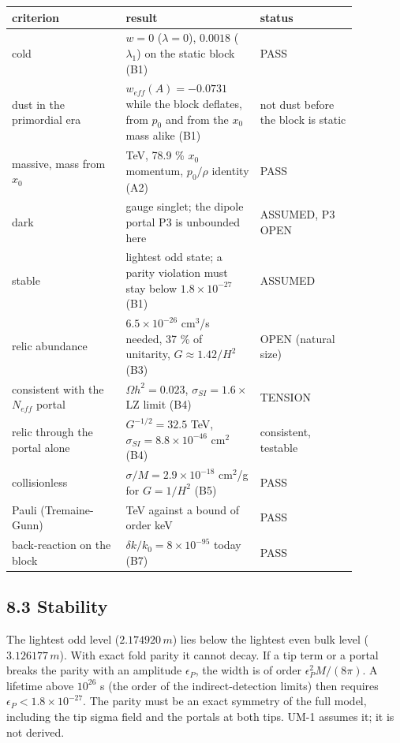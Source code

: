 \documentclass[11pt]{article}
\begin{document}
\begin{longtable}{>{\raggedright\arraybackslash}p{0.285\linewidth}>{\raggedright\arraybackslash}p{0.336\linewidth}>{\raggedright\arraybackslash}p{0.248\linewidth}}
\toprule
\textbf{criterion} & \textbf{result} & \textbf{status} \\
\midrule
cold & $w = 0$ ($\lambda = 0$), $0.0018$ ($\lambda_1$) on the static block (B1) & PASS \\
dust in the primordial era & $w_{eff}(A) = -0.0731$ while the block deflates, from $p_0$ and from the $x_0$ mass alike (B1) & not dust before the block is static \\
massive, mass from $x_0$ & 50.9 TeV, 78.9 \% $x_0$ momentum, $p_0/\rho$ identity (A2) & PASS \\
dark & gauge singlet; the dipole portal P3 is unbounded here & ASSUMED, P3 OPEN \\
stable & lightest odd state; a parity violation must stay below $1.8\times10^{-27}$ (B1) & ASSUMED \\
relic abundance & $6.5\times10^{-26}$ cm$^3$/s needed, 37 \% of unitarity, $G \approx 1.42/H^2$ (B3) & OPEN (natural size) \\
consistent with the $N_{eff}$ portal & $\Omega h^2 = 0.023$, $\sigma_{SI} = 1.6\times$ LZ limit (B4) & TENSION \\
relic through the portal alone & $G^{-1/2} = 32.5$ TeV, $\sigma_{SI} = 8.8\times10^{-46}$ cm$^2$ (B4) & consistent, testable \\
collisionless & $\sigma/M = 2.9\times10^{-18}$ cm$^2$/g for $G = 1/H^2$ (B5) & PASS \\
Pauli (Tremaine-Gunn) & 50.9 TeV against a bound of order keV & PASS \\
back-reaction on the block & $\delta k/k_0 = 8\times10^{-95}$ today (B7) & PASS \\
\bottomrule
\end{longtable}

\subsection*{8.3 Stability}

The lightest odd level ($2.174920\,m$) lies below the lightest even bulk level ($3.126177\,m$). With exact fold parity it cannot decay. If a tip term or a portal breaks the parity with an amplitude $\epsilon_P$, the width is of order $\epsilon_P^2M/(8\pi)$. A lifetime above $10^{26}$ s (the order of the indirect-detection limits) then requires $\epsilon_P < 1.8\times10^{-27}$. The parity must be an exact symmetry of the full model, including the tip sigma field and the portals at both tips. UM-1 assumes it; it is not derived.
\end{document}
